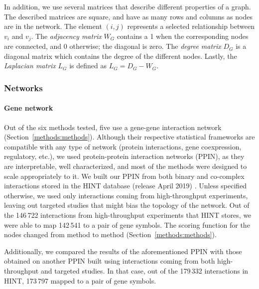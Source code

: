 \documentclass[twocolumn, 11pt]{article}
\begin{document}
In addition, we use several matrices that describe different properties of a graph. The described matrices are square, and have as many rows and columns as nodes are in the network. The element $(i,j)$ represents a  selected relationship between $v_i$ and $v_j$. The \emph{adjacency matrix} $W_G$ contains a 1 when the corresponding nodes are connected, and 0 otherwise; the diagonal is zero. The \emph{degree matrix} $D_G$ is a diagonal matrix which contains the degree of the different nodes. Lastly, the \emph{Laplacian matrix} $L_G$ is defined as $L_G = D_G - W_G$.

\subsubsection{Networks}
\label{methods:networks}

\paragraph{Gene network}
Out of the six methods tested, five use a gene-gene interaction network (Section~\ref{methods:methods}). Although their respective statistical frameworks are compatible with any type of network (protein interactions, gene coexpression, regulatory, etc.), we used protein-protein interaction networks (PPIN), as they are interpretable, well characterized, and most of the methods were designed to scale appropriately to it. We built our PPIN from both binary and co-complex interactions stored in the HINT database (release April 2019) \cite{das_hint:_2012}. Unless specified otherwise, we used only interactions coming from high-throughput experiments, leaving out targeted studies that might bias the topology of the network. Out of the 146\,722 interactions from high-throughput experiments that HINT stores, we were able to map 142\,541 to a pair of gene symbols. The scoring function for the nodes changed from method to method (Section~\ref{methods:methods}).

Additionally, we compared the results of the aforementioned PPIN with those obtained on another PPIN built using interactions coming from both high-throughput and targeted studies. In that case, out of the 179\,332 interactions in HINT, 173\,797 mapped to a pair of gene symbols. 
\end{document}
